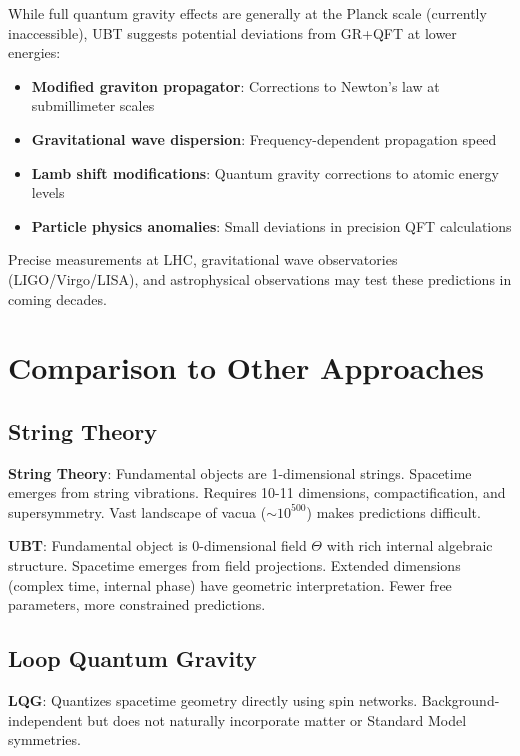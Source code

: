 \documentclass[12pt]{article}
\begin{document}
While full quantum gravity effects are generally at the Planck scale (currently inaccessible), UBT suggests potential deviations from GR+QFT at lower energies:

\begin{itemize}
    \item \textbf{Modified graviton propagator}: Corrections to Newton's law at submillimeter scales
    \item \textbf{Gravitational wave dispersion}: Frequency-dependent propagation speed
    \item \textbf{Lamb shift modifications}: Quantum gravity corrections to atomic energy levels
    \item \textbf{Particle physics anomalies}: Small deviations in precision QFT calculations
\end{itemize}

Precise measurements at LHC, gravitational wave observatories (LIGO/Virgo/LISA), and astrophysical observations may test these predictions in coming decades.

\section{Comparison to Other Approaches}

\subsection{String Theory}

\textbf{String Theory}: Fundamental objects are 1-dimensional strings. Spacetime emerges from string vibrations. Requires 10-11 dimensions, compactification, and supersymmetry. Vast landscape of vacua ($\sim 10^{500}$) makes predictions difficult.

\textbf{UBT}: Fundamental object is 0-dimensional field $\Theta$ with rich internal algebraic structure. Spacetime emerges from field projections. Extended dimensions (complex time, internal phase) have geometric interpretation. Fewer free parameters, more constrained predictions.

\subsection{Loop Quantum Gravity}

\textbf{LQG}: Quantizes spacetime geometry directly using spin networks. Background-independent but does not naturally incorporate matter or Standard Model symmetries.
\end{document}
